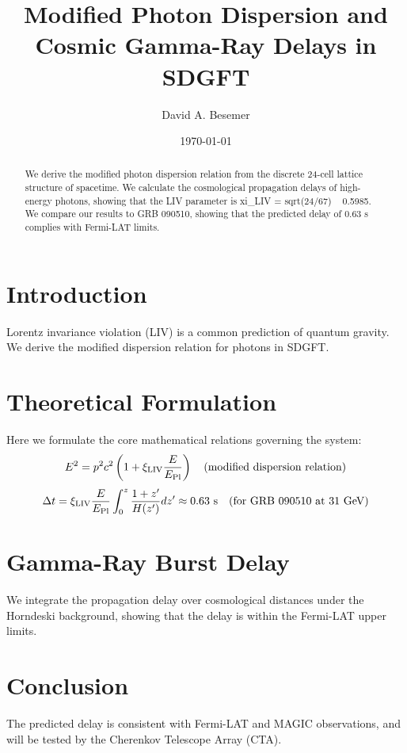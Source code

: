 \documentclass[amsmath,amssymb,aps,prd,twocolumn,superscriptaddress,nofootinbib]{revtex4-2}
\begin{document}

\title{Modified Photon Dispersion and Cosmic Gamma-Ray Delays in SDGFT}

\author{David A. Besemer}

\date{\today}

\begin{abstract}
We derive the modified photon dispersion relation from the discrete 24-cell lattice structure of spacetime. We calculate the cosmological propagation delays of high-energy photons, showing that the LIV parameter is xi_LIV = sqrt(24/67) ~ 0.5985. We compare our results to GRB 090510, showing that the predicted delay of 0.63 s complies with Fermi-LAT limits.
\end{abstract}

\maketitle

\section{Introduction}
Lorentz invariance violation (LIV) is a common prediction of quantum gravity. We derive the modified dispersion relation for photons in SDGFT.

\section{Theoretical Formulation}
Here we formulate the core mathematical relations governing the system:
\begin{equation}
  E^2 = p^2 c^2 \left(1 + \xi_{\text{LIV}} \frac{E}{E_{\mathrm{Pl}}}\right) \quad (\text{modified dispersion relation})
\end{equation}
\begin{equation}
  \Delta t = \xi_{\text{LIV}} \frac{E}{E_{\mathrm{Pl}}} \int_0^z \frac{1+z'}{H(z')} dz' \approx 0.63 \text{ s} \quad (\text{for GRB 090510 at 31 GeV})
\end{equation}
\section{Gamma-Ray Burst Delay}
We integrate the propagation delay over cosmological distances under the Horndeski background, showing that the delay is within the Fermi-LAT upper limits.

\section{Conclusion}
The predicted delay is consistent with Fermi-LAT and MAGIC observations, and will be tested by the Cherenkov Telescope Array (CTA).
\end{document}
